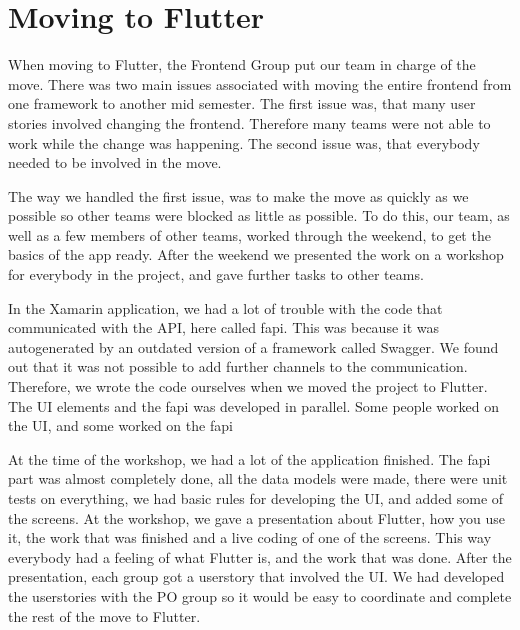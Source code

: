 \section{Moving to Flutter}
When moving to Flutter, the Frontend Group put our team in charge of the move. 
There was two main issues associated with moving the entire frontend from one framework to another mid semester.
The first issue was, that many user stories involved changing the frontend. Therefore many teams were not able to work while the change was happening.
The second issue was, that everybody needed to be involved in the move. 

The way we handled the first issue, was to make the move as quickly as we possible so other teams were blocked as little as possible.
To do this, our team, as well as a few members of other teams, worked through the weekend, to get the basics of the app ready. After the weekend we presented the work on a workshop for everybody in the project, and gave further tasks to other teams.

In the Xamarin application, we had a lot of trouble with the code that communicated with the API, here called \gls{fapi}. This was because it was autogenerated by an outdated version of a framework called Swagger. We found out that it was not possible to add further channels to the communication. Therefore, we wrote the code ourselves when we moved the project to Flutter. The UI elements and the \gls{fapi} was developed in parallel. Some people worked on the UI, and some worked on the \gls{fapi}

At the time of the workshop, we had a lot of the application finished. The \gls{fapi} part was almost completely done, all the data models were made, there were unit tests on everything, we had basic rules for developing the UI, and added some of the screens. 
At the workshop, we gave a presentation about Flutter, how you use it, the work that was finished and a live coding of one of the screens. This way everybody had a feeling of what Flutter is, and the work that was done. 
After the presentation, each group got a userstory that involved the UI. We had developed the userstories with the \gls{PO} group so it would be easy to coordinate and complete the rest of the move to Flutter.
